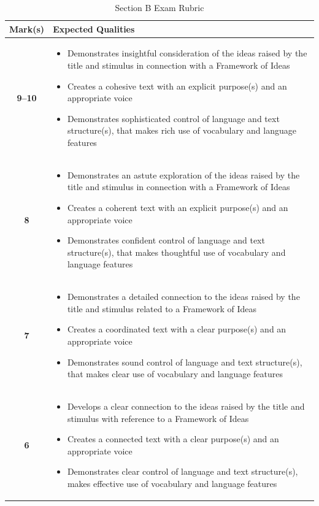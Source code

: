 \documentclass[a4paper]{article}
\begin{document}
\begin{longtable}{|c|p{13cm}|}
\caption{Section B Exam Rubric} \label{tab:sectionb}\\
\hline
\textbf{Mark(s)} & \textbf{Expected Qualities} \\
\hline
\textbf{9--10} & 
\begin{itemize}
  \item Demonstrates insightful consideration of the ideas raised by the title and stimulus in connection with a Framework of Ideas
  \item Creates a cohesive text with an explicit purpose(s) and an appropriate voice
  \item Demonstrates sophisticated control of language and text structure(s), that makes rich use of vocabulary and language features
\end{itemize} \\
\hline
\textbf{8} & 
\begin{itemize}
  \item Demonstrates an astute exploration of the ideas raised by the title and stimulus in connection with a Framework of Ideas
  \item Creates a coherent text with an explicit purpose(s) and an appropriate voice
  \item Demonstrates confident control of language and text structure(s), that makes thoughtful use of vocabulary and language features
\end{itemize} \\
\hline
\textbf{7} & 
\begin{itemize}
  \item Demonstrates a detailed connection to the ideas raised by the title and stimulus related to a Framework of Ideas
  \item Creates a coordinated text with a clear purpose(s) and an appropriate voice
  \item Demonstrates sound control of language and text structure(s), that makes clear use of vocabulary and language features
\end{itemize} \\
\hline
\textbf{6} & 
\begin{itemize}
  \item Develops a clear connection to the ideas raised by the title and stimulus with reference to a Framework of Ideas
  \item Creates a connected text with a clear purpose(s) and an appropriate voice
  \item Demonstrates clear control of language and text structure(s), makes effective use of vocabulary and language features

\end{itemize}
\end{longtable}
\end{document}
